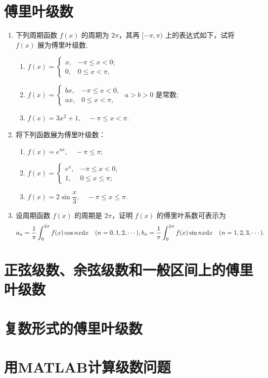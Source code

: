 \section{傅里叶级数}

\begin{enumerate}\setlength{\itemsep}{7pt}
    \item 下列周期函数 $f(x)$ 的周期为 $2\pi$，其再 $[-\pi, \pi)$ 上的表达式如下，试将 $f(x)$ 展为傅里叶级数.
    \begin{enumerate}[(1)]\setlength{\itemsep}{10pt}\setlength{\topsep}{15pt}
        \item 
        $
            f(x)=
            \begin{cases}
                x, &-\pi\leqslant x<0;\\
                0, &0\leqslant x< \pi,    
            \end{cases}
        $
        \item 
        $
            f(x)=
            \begin{cases}
                bx,&-\pi\leqslant x<0,\\
                ax,&0\leqslant x<\pi,
            \end{cases}
        $ $a>b>0$ 是常数;

        \item $f(x)=3x^2+1,\quad -\pi\leqslant x<\pi$.
    \end{enumerate}

    \item 将下列函数展为傅里叶级数：
    \begin{enumerate}[(1)]\setlength{\itemsep}{10pt}\setlength{\topsep}{15pt}
        \item $f(x)=e^{ax},\quad-\pi\leqslant \pi$;
        \item 
        $
            f(x)=
            \begin{cases}
                e^{x},&-\pi\leqslant x<0,\\
                1,&0\leqslant x\leqslant \pi;
            \end{cases}
        $

        \item $f(x)=2\sin\dfrac{x}{3},\quad -\pi\leqslant x\leqslant\pi$.
    \end{enumerate}

    \item 设周期函数 $f(x)$ 的周期是 $2\pi$，证明 $f(x)$ 的傅里叶系数可表示为
    \[
        a_n=\dfrac{1}{\pi}\int_{0}^{2\pi}f(x)\cos nx\text{d}x\quad(n=0,1,2,\cdots),\\
        b_n=\dfrac{1}{\pi}\int_{0}^{2\pi}f(x)\sin nx\text{d}x\quad(n=1,2,3,\cdots).
    \]
\end{enumerate}

\section{正弦级数、余弦级数和一般区间上的傅里叶级数}

\section{复数形式的傅里叶级数}

\section{用MATLAB计算级数问题}



